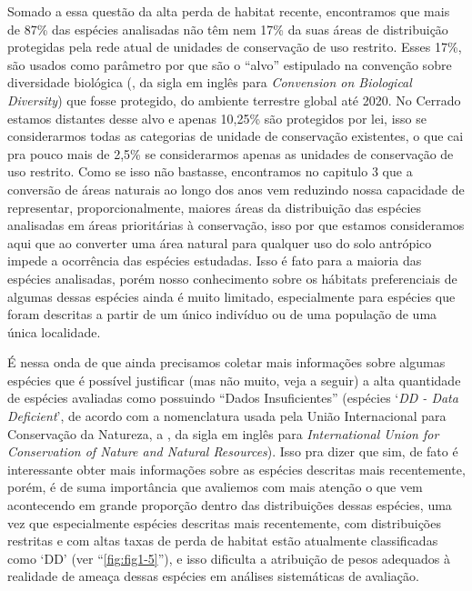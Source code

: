 \documentclass[12pt,openright,oneside,a4paper,english]{abntex2}
\begin{document}
Somado a essa questão da alta perda de habitat recente, encontramos que mais de 87\% das espécies analisadas não têm nem 17\% da suas áreas de distribuição protegidas pela rede atual de unidades de conservação de uso restrito. Esses 17\%, são usados como parâmetro por que são o “alvo” estipulado na convenção sobre diversidade biológica (\citeauthor{CBD2010}, da sigla em inglês para \textit{Convension on Biological Diversity}) que fosse protegido, do ambiente terrestre global até 2020. No Cerrado estamos distantes desse alvo e apenas 10,25\% são protegidos por lei, isso se considerarmos todas as categorias de unidade de conservação existentes, o que cai pra pouco mais de 2,5\% se considerarmos apenas as unidades de conservação de uso restrito. Como se isso não bastasse, encontramos no capitulo 3 que a conversão de áreas naturais ao longo dos anos vem reduzindo nossa capacidade de representar, proporcionalmente, maiores áreas da distribuição das espécies analisadas em áreas prioritárias à conservação, isso por que estamos consideramos aqui que ao converter uma área natural para qualquer uso do solo antrópico impede a ocorrência das espécies estudadas. Isso é fato para a maioria das espécies analisadas, porém nosso conhecimento sobre os hábitats preferenciais de algumas dessas espécies ainda é muito limitado, especialmente para espécies que foram descritas a partir de um único indivíduo ou de uma população de uma única localidade.

É nessa onda de que ainda precisamos coletar mais informações sobre algumas espécies que é possível justificar (mas não muito, veja a seguir) a alta quantidade de espécies avaliadas como possuindo “Dados Insuficientes” (espécies ‘\textit{DD - Data Deficient}’, de acordo com a nomenclatura usada pela União Internacional para Conservação da Natureza, a \citeauthor{IUCN2023}, da sigla em inglês para \textit{International Union for Conservation of Nature and Natural Resources}). Isso pra dizer que sim, de fato é interessante obter mais informações sobre as espécies descritas mais recentemente, porém, é de suma importância que avaliemos com mais atenção o que vem acontecendo em grande proporção dentro das distribuições dessas espécies, uma vez que especialmente espécies descritas mais recentemente, com distribuições restritas e com altas taxas de perda de habitat estão atualmente classificadas como ‘DD’ (ver “\autoref{fig:fig1-5}”), e isso dificulta a atribuição de pesos adequados à realidade de ameaça dessas espécies em análises sistemáticas de avaliação.
\end{document}
